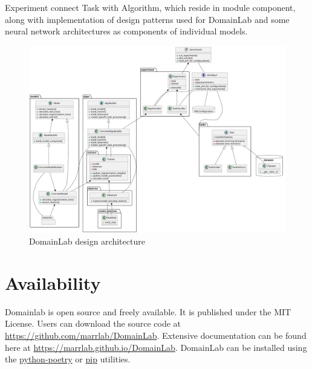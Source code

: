 Experiment connect Task with Algorithm, which reside in module
component, along with implementation of design patterns used for
DomainLab and some neural network architectures as components of
individual models.

\begin{figure}
\centering
\includegraphics{../docs/libDG.svg}
\caption{DomainLab design architecture~\label{fig:cdiagram}}
\end{figure}

\hypertarget{availability}{%
\section{Availability}\label{availability}}

Domainlab is open source and freely available. It is published under the
MIT License. Users can download the source code at
\url{https://github.com/marrlab/DomainLab}. Extensive documentation can
be found here at \url{https://marrlab.github.io/DomainLab}. DomainLab
can be installed using the
\href{https://python-poetry.org/}{python-poetry} or
\href{https://pypi.org/project/pip/}{pip} utilities.

